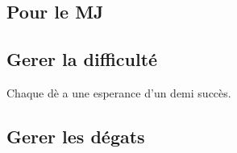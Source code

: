 \begin{landscape}
\begin{multicols}{4}


\section{Pour le MJ}

\subsection{Gerer la difficulté}

Chaque dè a une esperance d'un demi succès.


\subsection{Gerer les dégats}

\end{multicols}
\end{landscape}

